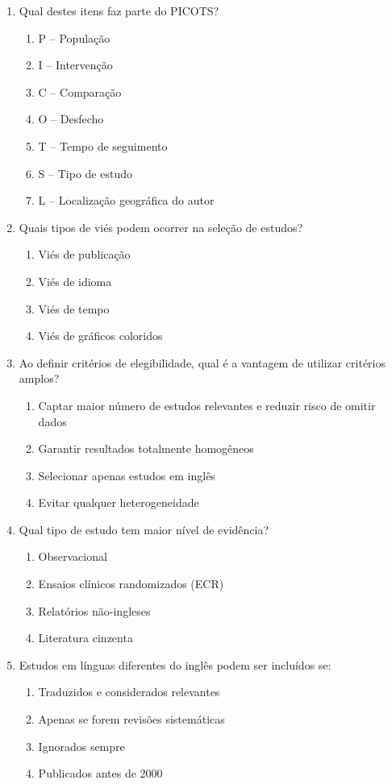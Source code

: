 \documentclass[12pt,a4paper]{article}
\begin{document}
\begin{enumerate}
\item Qual destes itens faz parte do PICOTS?
\begin{enumerate}
    \item P – População
    \item I – Intervenção
    \item C – Comparação
    \item O – Desfecho
    \item T – Tempo de seguimento
    \item S – Tipo de estudo
    \item L – Localização geográfica do autor
\end{enumerate}

\item Quais tipos de viés podem ocorrer na seleção de estudos?
\begin{enumerate}
    \item Viés de publicação
    \item Viés de idioma
    \item Viés de tempo
    \item Viés de gráficos coloridos
\end{enumerate}

\item Ao definir critérios de elegibilidade, qual é a vantagem de utilizar critérios amplos?
\begin{enumerate}
    \item Captar maior número de estudos relevantes e reduzir risco de omitir dados
    \item Garantir resultados totalmente homogêneos
    \item Selecionar apenas estudos em inglês
    \item Evitar qualquer heterogeneidade
\end{enumerate}

\item Qual tipo de estudo tem maior nível de evidência?
\begin{enumerate}
    \item Observacional
    \item Ensaios clínicos randomizados (ECR)
    \item Relatórios não-ingleses
    \item Literatura cinzenta
\end{enumerate}

\item Estudos em línguas diferentes do inglês podem ser incluídos se:
\begin{enumerate}
    \item Traduzidos e considerados relevantes
    \item Apenas se forem revisões sistemáticas
    \item Ignorados sempre
    \item Publicados antes de 2000
\end{enumerate}


\end{enumerate}
\end{document}
